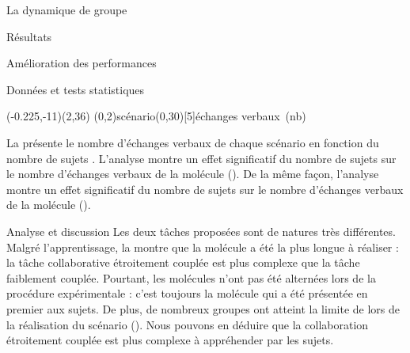\documentclass[myfrancais,ngerman,english,frenchb]{mythesis}
\begin{document}
\begin{mychapter}{La dynamique de groupe}
\begin{mysection}{Résultats}
\begin{mysubsection}{Amélioration des performances}
\begin{mysubsubsection}{Données et tests statistiques}
					\begin{myfigure}
						\begin{myps}(-0.225,-11)(2,36)
							\myaxes(0,2){scénario}(0,30)[5]{échanges verbaux~(nb)}
						\end{myps}
					\end{myfigure}

					La  présente le nombre d'échanges verbaux  de chaque scénario  en fonction du nombre de sujets .
					L'analyse montre un effet significatif du nombre de sujets  sur le nombre d'échanges verbaux  de la molécule \myPrion ().
					De la même façon, l'analyse montre un effet significatif du nombre de sujets  sur le nombre d'échanges verbaux  de la molécule \myUbiquitin ().
				\end{mysubsubsection}
				\begin{mysubsubsection}{Analyse et discussion}
					Les deux tâches proposées sont de natures très différentes.
					Malgré l'apprentissage, la  montre que la molécule \myUbiquitin a été la plus longue à réaliser : la tâche collaborative étroitement couplée est plus complexe que la tâche faiblement couplée.
					Pourtant, les molécules n'ont pas été alternées lors de la procédure expérimentale  : c'est toujours la molécule \myPrion qui a été présentée en premier aux sujets.
					De plus, de nombreux groupes ont atteint la limite de  lors de la réalisation du scénario  (\myUbiquitin).
					Nous pouvons en déduire que la collaboration étroitement couplée est plus complexe à appréhender par les sujets.


\end{mysubsubsection}
\end{mysubsection}
\end{mysection}
\end{mychapter}
\end{document}
